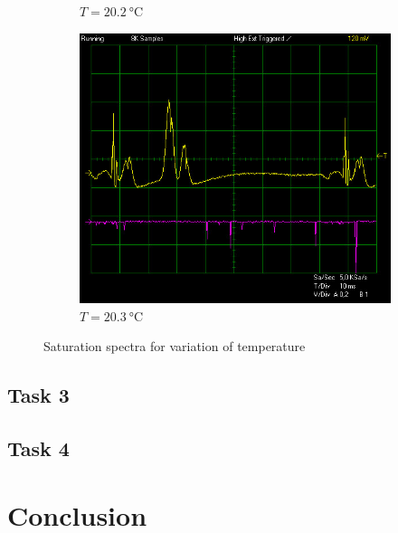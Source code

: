 \documentclass{article}
\begin{document}
\begin{figure}[h]
\begin{subfigure}[b]{0.3\textwidth}
        \caption{$T = \SI{20.2}{\celsius}$}
        \label{fig:202C}
    \end{subfigure}
    \begin{subfigure}[b]{0.3\textwidth}
        \includegraphics[width=\textwidth]{Figures/2/Iconst118mA/203.jpg}
        \caption{$T = \SI{20.3}{\celsius}$}
        \label{fig:203C}
    \end{subfigure}
    \caption{Saturation spectra for variation of temperature}
    \label{fig:VariedTemperature}
\end{figure}

\pagebreak{}

\subsection{Task 3}

\pagebreak{}

\subsection{Task 4}

\pagebreak{}

\section{Conclusion}

\pagebreak{}

\begin{appendices}


\end{appendices}

\pagebreak{}

 
 
\end{document}
